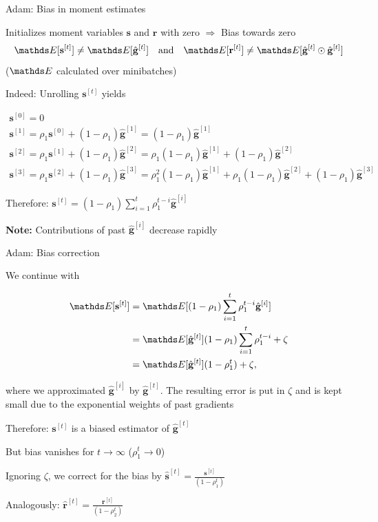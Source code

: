 \documentclass[11pt,compress,t,notes=noshow, xcolor=table]{beamer}
\begin{document}
\begin{framei}[fs=small]{Adam: Bias in moment estimates}
\item Initializes moment variables $\mathbf{s}$ and $\mathbf{r}$ with zero $\Rightarrow$ Bias towards zero
$$
\E[\mathbf{s}^{[t]}] \neq \E [\hat{\mathbf{g}}^{[t]}] \quad \text{and} \quad \E[\mathbf{r}^{[t]}] \neq \E [\hat{\mathbf{g}}^{[t]} \odot \hat{\mathbf{g}}^{[t]}]
$$
($\E$ calculated over minibatches)
\item Indeed: Unrolling $\mathbf{s}^{[t]}$ yields
\begin{footnotesize}
\begin{gather*}
\mathbf{s}^{[0]} = 0 \\
\mathbf{s}^{[1]} = \rho_1\mathbf{s}^{[0]} + (1 - \rho_1) \hat{\mathbf{g}}^{[1]} = (1 - \rho_1) \hat{\mathbf{g}}^{[1]} \\
\mathbf{s}^{[2]} = \rho_1\mathbf{s}^{[1]} + (1 - \rho_1) \hat{\mathbf{g}}^{[2]} = \rho_1 (1 - \rho_1) \hat{\mathbf{g}}^{[1]} + (1 - \rho_1) \hat{\mathbf{g}}^{[2]} \\
\mathbf{s}^{[3]} = \rho_1\mathbf{s}^{[2]} + (1 - \rho_1) \hat{\mathbf{g}}^{[3]} = \rho_1^2 (1 - \rho_1) \hat{\mathbf{g}}^{[1]} + \rho_1 (1 - \rho_1) \hat{\mathbf{g}}^{[2]} + (1 - \rho_1) \hat{\mathbf{g}}^{[3]}
\end{gather*}
\end{footnotesize}
\item Therefore: $\mathbf{s}^{[t]}  = (1 - \rho_1) \sum_{i=1}^t \rho_1^{t - i} \hat{\mathbf{g}}^{[i]}$
\item \textbf{Note:} Contributions of past $\hat{\mathbf{g}}^{[i]}$ decrease rapidly
\end{framei}


\begin{framei}[fs=small]{Adam: Bias correction}
\item We continue with
\begin{footnotesize}
\begin{align*}
\E [\mathbf{s}^{[t]}] &= \E [ (1 - \rho_1) \sum_{i=1}^t \rho_1^{t - i} \hat{\mathbf{g}}^{[i]}] \\
&= \E [\hat{\mathbf{g}}^{[t]}] (1 - \rho_1) \sum_{i=1}^t \rho_1^{t - i} + \zeta\\
&= \E [\hat{\mathbf{g}}^{[t]}] (1 - \rho_1^{t}) + \zeta,
\end{align*}
\end{footnotesize}
where we approximated $\hat{\mathbf{g}}^{[i]}$ by $\hat{\mathbf{g}}^{[t]}$.
The resulting error is put in $\zeta$ and is kept small due to the exponential weights of past gradients
\item Therefore: $\mathbf{s}^{[t]}$ is a biased estimator of $\hat{\mathbf{g}}^{[t]}$
\item But bias vanishes for $t \to \infty$ ($\rho_1^t \rightarrow 0$)
\item Ignoring $\zeta$, we correct for the bias by $\hat{\mathbf{s}}^{[t]} = \frac{\mathbf{s}^{[t]}}{(1 - \rho_1^{t})}$
\item Analogously: $\hat{\mathbf{r}}^{[t]} = \frac{\mathbf{r}^{[t]}}{(1 - \rho_2^{t})}$
\end{framei}
\end{document}
